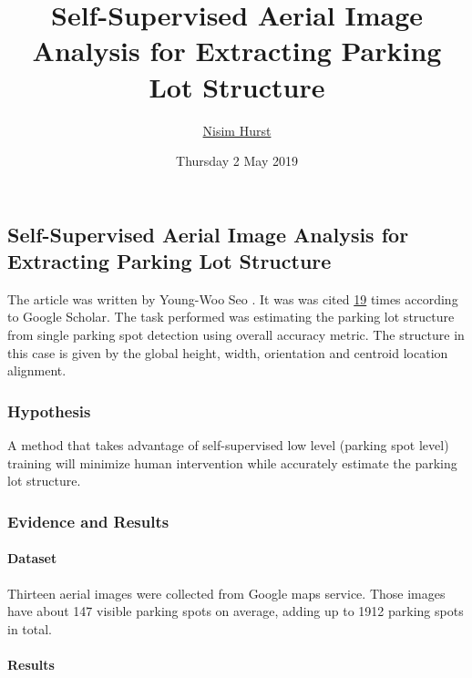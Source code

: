 \documentclass[]{article}
\title{Self-Supervised Aerial Image Analysis for Extracting Parking Lot Structure}
\author{\href{mailto:langheran@gmail.com}{Nisim Hurst}}
\date{Thursday 2 May 2019}
\let\oldparagraph\paragraph
\renewcommand{\paragraph}[1]{\oldparagraph{#1}\mbox{}}
\begin{document}
\maketitle

\label{toc}

\hypertarget{self-supervised-aerial-image-analysis-for-extracting-parking-lot-structure}{%
\subsection{Self-Supervised Aerial Image Analysis for Extracting Parking Lot Structure}\label{self-supervised-aerial-image-analysis-for-extracting-parking-lot-structure}}

The article was written by Young-Woo Seo \autocite{seo2009self}. It was was cited \href{https://scholar.google.com/scholar?client=ubuntu\&channel=fs\&oe=utf-8\&pws=1\&safe=active\&um=1\&ie=UTF-8\&lr\&cites=7197783101959033316}{19} times according to Google Scholar. The task performed was estimating the parking lot structure from single parking spot detection using overall accuracy metric. The structure in this case is given by the global height, width, orientation and centroid location alignment.

\hypertarget{hypothesis}{%
\subsubsection{Hypothesis}\label{hypothesis}}

A method that takes advantage of self-supervised low level (parking spot level) training will minimize human intervention while accurately estimate the parking lot structure.

\hypertarget{evidence-and-results}{%
\subsubsection{Evidence and Results}\label{evidence-and-results}}

\hypertarget{dataset}{%
\paragraph{Dataset}\label{dataset}}

Thirteen aerial images were collected from Google maps service. Those images have about 147 visible parking spots on average, adding up to 1912 parking spots in total.

\hypertarget{results}{%
\paragraph{Results}\label{results}}
\end{document}
